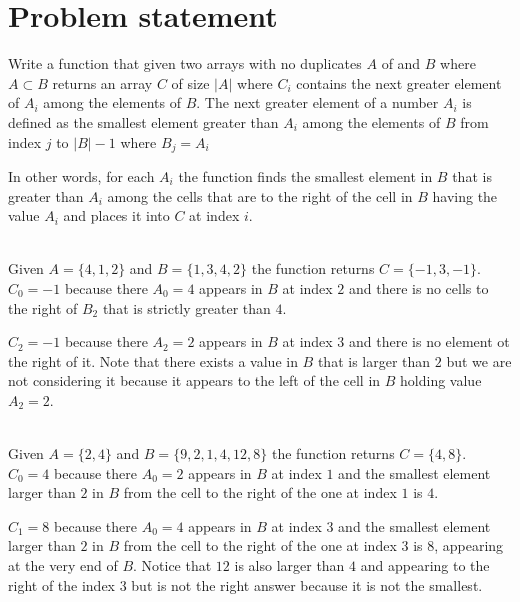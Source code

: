 \section{Problem statement}
\begin{exercise}
\label{example:next_greater_element:exercice1}
Write a function that given two arrays with no duplicates $A$ of and $B$ where $A \subset B$
returns an array $C$ of size $|A|$ where $C_i$ 
contains the next greater element of $A_i$ among the elements of $B$.
The next greater element of a number $A_i$ is defined as the smallest element greater than $A_i$ among the elements of 
$B$ from index $j$ to $|B|-1$ where $B_j = A_i$

In other words, for each $A_i$ the function finds the smallest element in $B$ that is greater than $A_i$ 
among the cells that are to the right of the cell in $B$ having the value $A_i$ and places it into 
$C$ at index $i$.

	\begin{example}
		\label{example:next_greater_element:example1}
		\hfill \\
		Given $A=\{4,1,2\}$ and $B=\{1,3,4,2\}$ the function returns $C=\{-1,3,-1\}$.
		$C_0 = -1$ because there $A_0 = 4$ appears in $B$ at index $2$ 
		and there is no cells to the right of $B_2$ that is strictly greater than $4$.
		
		$C_2 = -1$ because there $A_2 = 2$ appears in $B$ at index $3$ and there is no element ot the right of it.
		Note that there exists a value in $B$ that is larger than $2$ but we are not considering it because it appears to the left
		of the cell in $B$ holding value $A_2=2$.
		
	\end{example}

	\begin{example}
		\label{example:next_greater_element:example2}
		\hfill \\
		Given $A=\{2,4\}$ and $B=\{9,2,1,4,12,8\}$ the function returns $C=\{4,8\}$.
		$C_0 = 4$ because there $A_0 = 2$ appears in $B$ at index $1$ 
		and  the smallest element larger than $2$ in $B$ from the cell to the right of the one at index $1$ is $4$.
		
		$C_1 = 8$ because there $A_0 = 4$ appears in $B$ at index $3$ 
		and  the smallest element larger than $2$ in $B$ from the cell to the right of the one at index $3$ is $8$, appearing at the very end of $B$.
		Notice that $12$ is also larger than $4$ and appearing to the right of the index $3$ but is not the right answer because it is not the smallest.
	\end{example}
\end{exercise}

